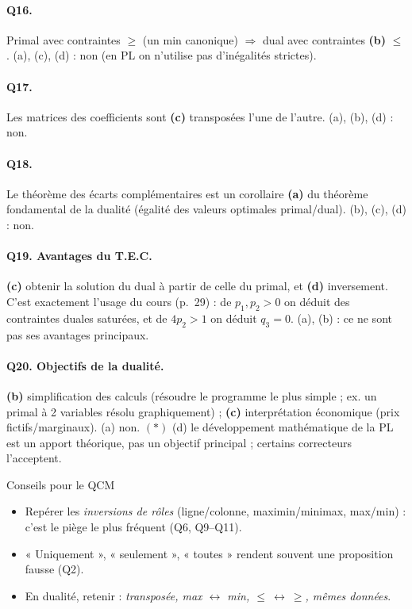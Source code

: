 \documentclass[11pt,a4paper]{article}
\newcommand{\bon}[1]{\textcolor{green!50!black}{\textbf{#1}}}
\newcommand{\faux}[1]{\textcolor{red!70!black}{#1}}
\begin{document}
\paragraph{Q16.} Primal avec contraintes $\ge$ (un min canonique) $\Rightarrow$ dual avec contraintes \bon{(b)} $\le$. \faux{(a)}, \faux{(c)}, \faux{(d)} : non (en PL on n'utilise pas d'inégalités strictes).

\paragraph{Q17.} Les matrices des coefficients sont \bon{(c)} transposées l'une de l'autre. \faux{(a)}, \faux{(b)}, \faux{(d)} : non.

\paragraph{Q18.} Le théorème des écarts complémentaires est un corollaire \bon{(a)} du théorème fondamental de la dualité (égalité des valeurs optimales primal/dual). \faux{(b)}, \faux{(c)}, \faux{(d)} : non.

\paragraph{Q19. Avantages du T.E.C.}
\bon{(c)} obtenir la solution du dual à partir de celle du primal, et \bon{(d)} inversement. C'est exactement l'usage du cours (p.~29) : de $p_1,p_2>0$ on déduit des contraintes duales saturées, et de $4p_2>1$ on déduit $q_3=0$. \faux{(a)}, \faux{(b)} : ce ne sont pas ses avantages principaux.

\paragraph{Q20. Objectifs de la dualité.}
\bon{(b)} simplification des calculs (résoudre le programme le plus simple ; ex. un primal à 2 variables résolu graphiquement) ; \bon{(c)} interprétation économique (prix fictifs/marginaux). \faux{(a)} non. $(\ast)$ \faux{(d)} le développement mathématique de la PL est un apport théorique, pas un objectif principal ; certains correcteurs l'acceptent.

\begin{rembox}{Conseils pour le QCM}
\begin{itemize}[leftmargin=*]
\item Repérer les \emph{inversions de rôles} (ligne/colonne, maximin/minimax, max/min) : c'est le piège le plus fréquent (Q6, Q9--Q11).
\item « Uniquement », « seulement », « toutes » rendent souvent une proposition fausse (Q2).
\item En dualité, retenir : \emph{transposée, max $\leftrightarrow$ min, $\le\ \leftrightarrow\ \ge$, mêmes données}.
\end{itemize}
\end{rembox}
\end{document}
